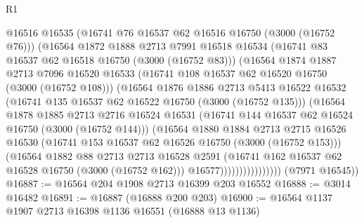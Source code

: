 \begin{lexlean}{R1}
\begin{coremodule}
                          @16516
                          @16535
                          (@16741 @76 @16537 @62 @16516 @16750 (@3000 (@16752 @76)))
                          (@16564
                            @1872
                            @1888
                            @2713
                            @7991
                            @16518
                            @16534
                            (@16741 @83 @16537 @62 @16518 @16750 (@3000 (@16752 @83)))
                            (@16564
                              @1874
                              @1887
                              @2713
                              @7096
                              @16520
                              @16533
                              (@16741 @108 @16537 @62 @16520 @16750 (@3000 (@16752 @108)))
                              (@16564
                                @1876
                                @1886
                                @2713
                                @5413
                                @16522
                                @16532
                                (@16741 @135 @16537 @62 @16522 @16750 (@3000 (@16752 @135)))
                                (@16564
                                  @1878
                                  @1885
                                  @2713
                                  @2716
                                  @16524
                                  @16531
                                  (@16741 @144 @16537 @62 @16524 @16750 (@3000 (@16752 @144)))
                                  (@16564
                                    @1880
                                    @1884
                                    @2713
                                    @2715
                                    @16526
                                    @16530
                                    (@16741 @153 @16537 @62 @16526 @16750 (@3000 (@16752 @153)))
                                    (@16564
                                      @1882
                                      @88
                                      @2713
                                      @2713
                                      @16528
                                      @2591
                                      (@16741 @162 @16537 @62 @16528 @16750 (@3000 (@16752 @162)))
                                      @16577))))))))))))))))
      (@7971 @16545))
@16887 := @16564 @204 @1908 @2713 @16399 @203 @16552
@16888 := @3014 @16482
@16891 := @16887 (@16888 @200 @203)
@16900 := @16564 @1137 @1907 @2713 @16398 @1136 @16551 (@16888 @13 @1136)

\end{coremodule}
\end{lexlean}
